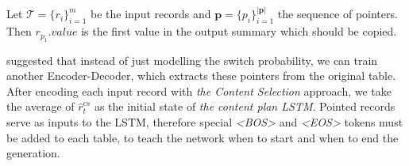 Let $\mathcal{T} = \{r_i\}_{i=1}^m$ be the input records and $\mathbf{p} = \{p_i\}_{i=1}^{|\mathbf{p}|}$ the sequence of pointers. Then $r_{p_1}.value$ is the first value in the output summary which should be copied. 

\citep{puduppully2019datatotext} suggested that instead of just modelling the switch probability, we can train another Encoder-Decoder, which extracts these pointers from the original table. After encoding each input record with \emph{the Content Selection} approach, we take the average of $\hat{r}_t^{cs}$ as the initial state of \emph{the content plan LSTM}. Pointed records serve as inputs to the LSTM, therefore special \emph{\textless BOS\textgreater} and \emph{\textless EOS\textgreater} tokens must be added to each table, to teach the network when to start and when to end the generation.